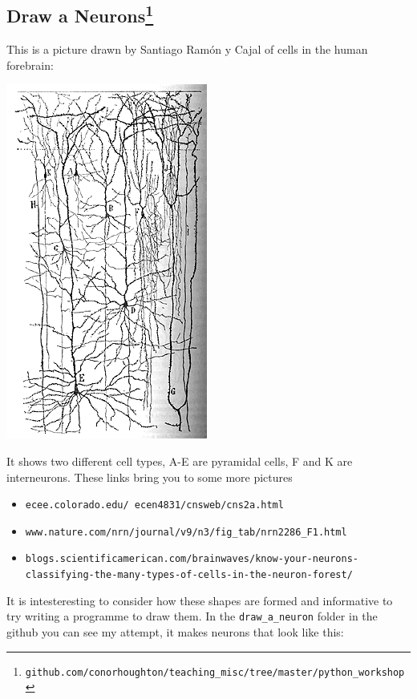 \documentclass[11pt,a4paper]{scrartcl}
\begin{document}
\subsection*{Draw a Neurons\footnote{\texttt{github.com/conorhoughton/teaching_misc/tree/master/python\_workshop}}}

This is a picture drawn by Santiago Ram\'{o}n y Cajal of cells in the human forebrain:
\begin{center}
\includegraphics{images/cajal.gif}
\end{center} 
It shows two different cell types, A-E are pyramidal cells, F and K are interneurons. These links bring you to some more pictures 
\begin{itemize}
\item \texttt{ecee.colorado.edu/~ecen4831/cnsweb/cns2a.html}
\item \texttt{www.nature.com/nrn/journal/v9/n3/fig\_tab/nrn2286\_F1.html}
\item \texttt{blogs.scientificamerican.com/brainwaves/know-your-neurons-classifying-the-many-types-of-cells-in-the-neuron-forest/}
\end{itemize}
It is intesteresting to consider how these shapes are formed and
informative to try writing a programme to draw them. In the
\texttt{draw\_a\_neuron} folder in the github you can see my attempt,
it makes neurons that look like this:
\end{document}
